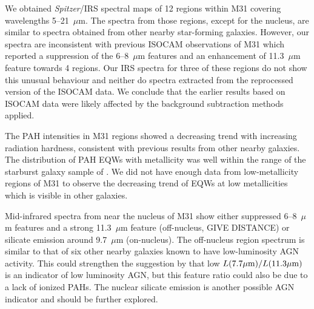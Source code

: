 We  obtained {\em Spitzer}/IRS spectral maps of 12 regions within M31 covering wavelengths 5--21~$\mu$m. 
The spectra from those regions, except for the nucleus, are similar to spectra obtained from other nearby  star-forming galaxies. 
However, our spectra are inconsistent with previous ISOCAM observations of M31 \citep{1998Cesarsky} which reported a suppression 
of the 6--8~$\mu$m features and an enhancement of 11.3~$\mu$m feature towards 4 regions. 
Our IRS spectra for three of these regions do not show this unusual behaviour and neither do spectra extracted from the reprocessed version
of the ISOCAM data.
We conclude that the earlier results based on ISOCAM data were likely affected by the background subtraction methods applied.

The PAH intensities in M31 regions showed a decreasing trend with increasing radiation hardness, consistent with previous 
results from other nearby galaxies. The distribution of PAH EQWs with metallicity was well within the range of the starburst galaxy sample of \citet{Engelbracht_2008}. 
We did not have enough data from low-metallicity regions of M31 to observe the decreasing trend of EQWs at low metallicities which is visible in other galaxies.

Mid-infrared spectra from near the nucleus of M31 show either suppressed 6--8~$\mu$m features and a strong 11.3~$\mu$m feature
(off-nucleus, GIVE DISTANCE) or silicate emission around 9.7~$\mu$m  (on-nucleus). The off-nucleus region spectrum is similar to that of
six other nearby galaxies known to have low-luminosity AGN activity. This could strengthen the
suggestion by \citet{Smith:2007lr} that low $L(7.7\mu{\rm m})/L(11.3\mu{\rm m})$ is an indicator of low luminosity AGN,
but this feature ratio could also be due to a lack of ionized PAHs. The nuclear silicate emission is another possible AGN indicator
and should be further explored. %
 